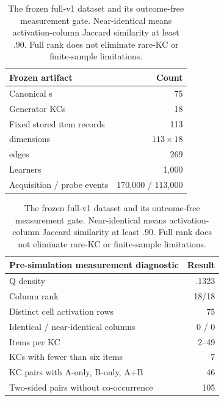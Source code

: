 \begin{table}[t]
  \centering
  \small
  \begin{minipage}[t]{.43\textwidth}
    \centering
    \begin{tabular}{@{}lr@{}}
      \toprule
      Frozen artifact & Count \\
      \midrule
      Canonical \grammarcell{}s & 75 \\
      Generator KCs & 18 \\
      Fixed stored item records & 113 \\
      \qstar{} dimensions & $113{\times}18$ \\
      \qstar{} edges & 269 \\
      Learners & 1,000 \\
      Acquisition / probe events & 170,000 / 113,000 \\
      \bottomrule
    \end{tabular}
  \end{minipage}\hfill
  \begin{minipage}[t]{.54\textwidth}
    \centering
    \begin{tabular}{@{}lr@{}}
      \toprule
      Pre-simulation measurement diagnostic & Result \\
      \midrule
      Q density & .1323 \\
      Column rank & 18/18 \\
      Distinct cell activation rows & 75 \\
      Identical / near-identical columns & 0 / 0 \\
      Items per KC & 2--49 \\
      KCs with fewer than six items & 7 \\
      KC pairs with A-only, B-only, A+B & 46 \\
      Two-sided pairs without co-occurrence & 105 \\
      \bottomrule
    \end{tabular}
  \end{minipage}
  \caption{The frozen full-v1 dataset and its outcome-free measurement gate.
  Near-identical means activation-column Jaccard similarity at least .90.
  Full rank does not eliminate rare-KC or finite-sample limitations.}
  \label{tab:measurement-results}
\end{table}
